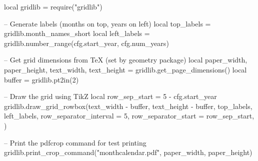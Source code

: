 \documentclass{article}
\begin{document}
\vspace*{0pt}
\thispagestyle{empty}
\begin{luacode*}
local gridlib = require("gridlib")

-- Generate labels (months on top, years on left)
local top_labels = gridlib.month_names_short
local left_labels = gridlib.number_range(cfg.start_year, cfg.num_years)

-- Get grid dimensions from TeX (set by geometry package)
local paper_width, paper_height, text_width, text_height = gridlib.get_page_dimensions()
local buffer = gridlib.pt2in(2)


-- Draw the grid using TikZ
local row_sep_start = 5 - cfg.start_year %
gridlib.draw_grid_rowbox(text_width - buffer, text_height - buffer, top_labels, left_labels, {
  row_separator_interval = 5,
  row_separator_start = row_sep_start,
})

-- Print the pdfcrop command for test printing
gridlib.print_crop_command("monthcalendar.pdf", paper_width, paper_height)
\end{luacode*}
\end{document}
